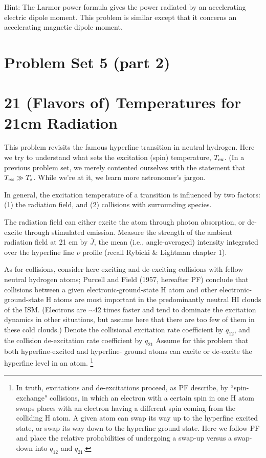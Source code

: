 \documentclass[11pt]{article}
\begin{document}
Hint: The Larmor power formula gives the power radiated by an accelerating
electric dipole moment. This problem is similar except that it concerns an
accelerating magnetic dipole moment.

\section*{\centering Problem Set 5 (part 2)}

\def\Tex{{T_{\rm ex}}}
\def\Jbar{{\bar J}}
\def\qot{{q_{12}}}
\def\qto{{q_{21}}}
\def\Ato{{A_{21}}}
\section{21 (Flavors of) Temperatures for 21cm Radiation}

This problem revisits the famous hyperfine transition in neutral hydrogen. Here
we try to understand what sets the excitation (spin) temperature, $\Tex$. (In a
previous problem set, we merely contented ourselves with the statement that 
$\Tex\gg T_*$.  While we're at it, we learn more astronomer's jargon.

In general, the excitation temperature of a transition is influenced by two
factors: (1) the radiation field, and (2) collisions with surrounding species.

The radiation field can either excite the atom through photon absorption, or
de-excite through stimulated emission. Measure the strength of the ambient
radiation field at 21 cm by $\Jbar$, the mean (i.e., angle-averaged) intensity
integrated over the hyperfine line $\nu$ profile (recall Rybicki \& Lightman chapter
1).

As for collisions, consider here exciting and de-exciting collisions with
fellow neutral hydrogen atoms; Purcell and Field (1957, hereafter PF) conclude
that collisions between a given electronic-ground-state H atom and other
electronic-ground-state H atoms are most important in the predominantly neutral
HI clouds of the ISM. (Electrons are $\sim$42 times faster and tend to dominate
the excitation dynamics in other situations, but assume here that there are too
few of them in these cold clouds.) Denote the collisional excitation rate
coefficient by $\qot$, and the collision de-excitation rate coefficient by
$\qto$ Assume for this problem that both hyperfine-excited and hyperfine-
ground atoms can excite or de-excite the hyperfine level in an atom.
\footnote{ In truth, excitations and de-excitations proceed, as PF describe, by
``spin-exchange" collisions, in which an electron with a certain spin in one H
atom swaps places with an electron having a different spin coming from the
colliding H atom. A given atom can swap its way up to the hyperfine excited
state, or swap its way down to the hyperfine ground state. Here we follow PF
and place the relative probabilities of undergoing a swap-up versus a swap-down
into $\qot$ and $\qto$.}
\end{document}
